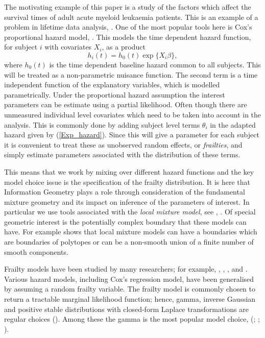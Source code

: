 \documentclass[graybox]{svmult}
\begin{document}
The motivating example of this paper is a study of the factors which affect the survival times of adult acute myeloid leukaemia patients. This is an example of a problem in lifetime data analysis, \cite{Lawless1981}. One of the most popular tools here is  Cox's proportional hazard model, \cite{Cox1972}. This models the time dependent hazard function, for subject $i$ with covariates $X_i$, as a product
$$
h_i(t) = h_0(t) \exp\{X_i\beta \},
$$ where $h_0(t)$ is the time dependent baseline hazard common to all subjects. This will be treated as a non-parametric nuisance function. The second term is a time independent  function of the explanatory variables, which is modelled parametrically. Under the proportional hazard  assumption the interest parameters can be estimate using a partial likelihood. Often though there are unmeasured individual level covariates which need to be taken into account in the analysis. This is commonly done by adding  subject level  terms $\theta_i$ in the adapted hazard given by (\ref{Exp_hazard}). Since this will give a parameter for each subject it is convenient to treat these as unobserved  random effects, or {\em  frailties}, and simply estimate parameters associated with the distribution of these terms. 

This  means that we work by mixing over different hazard functions and the key  model choice issue is the specification of the frailty distribution.  It is  here that Information Geometry plays a role through consideration of the fundamental mixture geometry  and its impact on  inference of the parameters of interest. In particular we use  tools associated with  the {\em local mixture model}, see  \cite{Marriott2002}, \cite{anaya2007local}. Of special geometric interest  is the potentially complex boundary that these models can have. For example   \cite{Maroufy2015} shows that local mixture models can have a boundaries which are boundaries of  polytopes or  can be  a non-smooth union of a finite number of smooth components.




Frailty models have been studied by many researchers;
for example,  \cite{Clayton1978},  \cite{Hougaard1986a}, \cite{Klein1992}, and \cite{Gorfine2006}. 
Various hazard models, including Cox's regression model, have
been generalised by assuming a  random  frailty variable.  The frailty model is commonly chosen to return a tractable marginal likelihood
function; hence, gamma, inverse
Gaussian and positive stable distributions  with closed-form Laplace transformations
are regular choices (\cite[p.77]{Cook2007}). Among these the gamma is the most popular model choice,  
(\cite{Klein1992}; \cite{Nielsen1992}; \cite{Vaupel1979}). 
\end{document}
